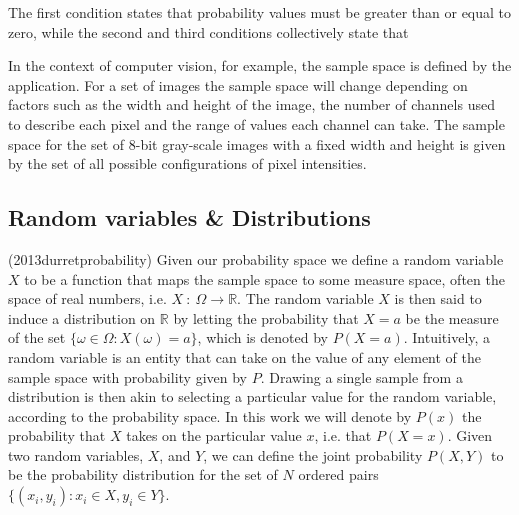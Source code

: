 The first condition states that probability values must be greater than or equal to zero, while the second and third conditions collectively state that 

In the context of computer vision, for example, the sample space is defined by the application. For a set of images the sample space will change depending on factors such as the width and height of the image, the number of channels used to describe each pixel and the range of values each channel can take. The sample space for the set of 8-bit gray-scale images with a fixed width and height is given by the set of all possible configurations of pixel intensities. 

\subsection{Random variables \& Distributions}

(2013durretprobability)
Given our probability space we define a random variable $X$ to be a function that maps the sample space to some measure space, often the space of real numbers, i.e. $X\: : \: \Omega \rightarrow \mathbb{R}$. The random variable $X$ is then said to induce a distribution on $\mathbb{R}$ by letting the probability that $X = a$ be the measure of the set $\{\omega \in \Omega : X(\omega) = a\}$, which is denoted by $P(X = a)$. Intuitively, a random variable is an entity that can take on the value of any element of the sample space with probability given by $P$. Drawing a single sample from a distribution is then akin to selecting a particular value for the random variable, according to the probability space. In this work we will denote by $P(x)$ the probability that $X$ takes on the particular value $x$, i.e. that $P(X = x)$. Given two random variables, $X$, and $Y$, we can define the joint probability $P(X,Y)$ to be the probability distribution for the set of $N$ ordered pairs $\{(x_i,y_i) : x_i \in X, y_i \in Y\}$.

